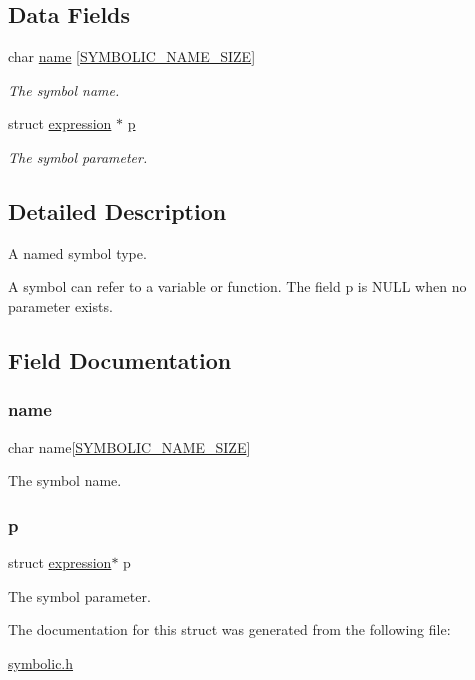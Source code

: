 \subsection*{Data Fields}
\begin{DoxyCompactItemize}
\item 
char \hyperlink{structsym_ab3675903eb67a0a887759b93892151a5}{name} \mbox{[}\hyperlink{symbolic_8h_aeb7545cf4c9c6df72954b9409a00a885}{S\+Y\+M\+B\+O\+L\+I\+C\+\_\+\+N\+A\+M\+E\+\_\+\+S\+I\+ZE}\mbox{]}
\begin{DoxyCompactList}\small\item\em The symbol name. \end{DoxyCompactList}\item 
struct \hyperlink{structexpression}{expression} $\ast$ \hyperlink{structsym_a0796b3f7efa6a72c76822710e20c6060}{p}
\begin{DoxyCompactList}\small\item\em The symbol parameter. \end{DoxyCompactList}\end{DoxyCompactItemize}


\subsection{Detailed Description}
A named symbol type. 

A symbol can refer to a variable or function. The field p is N\+U\+LL when no parameter exists. 

\subsection{Field Documentation}
\mbox{\label{structsym_ab3675903eb67a0a887759b93892151a5}} 
\subsubsection{\texorpdfstring{name}{name}}
{\footnotesize\ttfamily char name\mbox{[}\hyperlink{symbolic_8h_aeb7545cf4c9c6df72954b9409a00a885}{S\+Y\+M\+B\+O\+L\+I\+C\+\_\+\+N\+A\+M\+E\+\_\+\+S\+I\+ZE}\mbox{]}}



The symbol name. 

\mbox{\label{structsym_a0796b3f7efa6a72c76822710e20c6060}} 
\subsubsection{\texorpdfstring{p}{p}}
{\footnotesize\ttfamily struct \hyperlink{structexpression}{expression}$\ast$ p}



The symbol parameter. 



The documentation for this struct was generated from the following file\+:\begin{DoxyCompactItemize}
\item 
\hyperlink{symbolic_8h}{symbolic.\+h}\end{DoxyCompactItemize}
